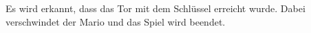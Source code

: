 Es wird erkannt, dass das Tor mit dem Schl\"ussel erreicht wurde. Dabei verschwindet der Mario und das Spiel wird beendet.  